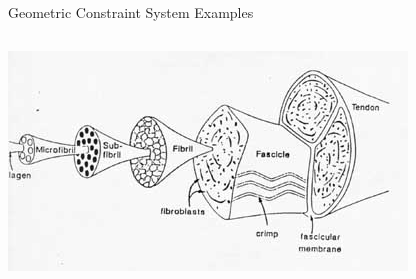 \documentclass{mySlides}
\begin{document}
\begin{frame}{Geometric Constraint System Examples}
\begin{columns}
\begin{column}{0.225\textwidth}
        \includegraphics[width=\linewidth]{../../img/ligten2.jpg}


    \end{column}
    \end{columns}
\end{frame}
\end{document}
